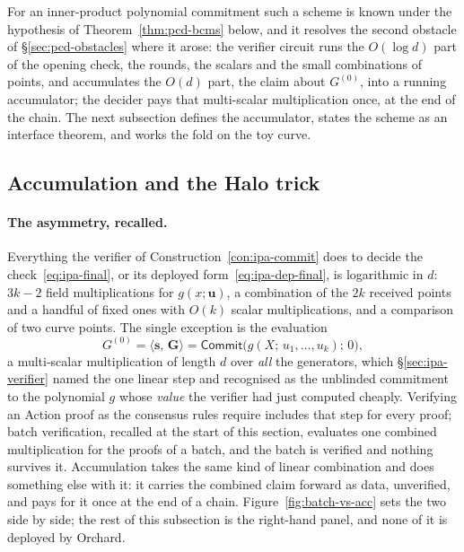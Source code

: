 \documentclass[11pt,a4paper]{article}
\theoremstyle{definition}
\newcommand{\ip}[2]{\langle #1,\, #2 \rangle}
\newcommand{\Comm}{\mathsf{Commit}}
\begin{document}
For an inner-product polynomial commitment such a scheme is known under
the hypothesis of Theorem~\ref{thm:pcd-bcms} below, and it resolves
the second obstacle of \S\ref{sec:pcd-obstacles} where it arose: the
verifier circuit runs the $O(\log d)$ part of the opening check, the
rounds, the scalars and the small combinations of points, and
accumulates the $O(d)$ part, the claim about $G^{(0)}$, into a running
accumulator; the decider pays that multi-scalar multiplication once, at
the end of the chain. The next subsection defines the accumulator,
states the scheme as an interface theorem, and works the fold on the toy
curve.

\subsection{Accumulation and the Halo trick}
\label{sec:pcd-halo-trick}

\paragraph{The asymmetry, recalled.}
Everything the verifier of Construction~\ref{con:ipa-commit} does to
decide the check~\eqref{eq:ipa-final}, or its deployed
form~\eqref{eq:ipa-dep-final}, is logarithmic in $d$: $3k - 2$ field
multiplications for $g(x; \mathbf u)$, a combination of the $2k$
received points and a handful of fixed ones with $O(k)$ scalar
multiplications, and a comparison of two curve points. The single
exception is the evaluation
\[
G^{(0)} = \ip{\mathbf s}{\mathbf G} = \Comm\bigl(g(X;\, u_1, \dots,
  u_k);\, 0\bigr),
\]
a multi-scalar multiplication of length $d$ over \emph{all} the
generators, which \S\ref{sec:ipa-verifier} named the one linear step and
recognised as the unblinded commitment to the polynomial $g$ whose
\emph{value} the verifier had just computed cheaply. Verifying an
Action proof as the consensus rules require includes that step for every
proof; batch verification, recalled at the start of this section,
evaluates one combined multiplication for the proofs of a batch, and the
batch is verified and nothing survives it. Accumulation takes the same
kind of linear combination and does something else with it: it carries
the combined claim forward as data, unverified, and pays for it once at
the end of a chain. Figure~\ref{fig:batch-vs-acc} sets the two side by side;
the rest of this subsection is the right-hand panel, and none of it is
deployed by Orchard.
\end{document}
